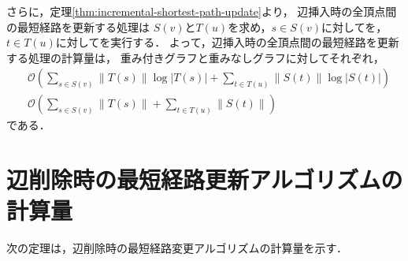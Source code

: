 さらに，定理\ref{thm:incremental-shortest-path-update}より，
辺挿入時の全頂点間の最短経路を更新する処理は
$S(v)$と$T(u)$を求め，$s\in S(v)$に対してを，
$t\in T(u)$に対してを実行する．
よって，辺挿入時の全頂点間の最短経路を更新する処理の計算量は，
重み付きグラフと重みなしグラフに対してそれぞれ，
\begin{align}
  &\mathcal{O}\left(\sum_{s\in S(v)}\|T(s)\|\log|T(s)|+\sum_{t\in T(u)}\|S(t)\|\log|S(t)|\right)
  \label{eq:full-incremental-shortest-path-update-weighted} \\
  &\mathcal{O}\left(\sum_{s\in S(v)}\|T(s)\|+\sum_{t\in T(u)}\|S(t)\|\right)
  \label{eq:full-incremental-shortest-path-update-unweighted}
  \end{align}
である．

\section{辺削除時の最短経路更新アルゴリズムの計算量}
次の定理は，辺削除時の最短経路変更アルゴリズムの計算量を示す．


